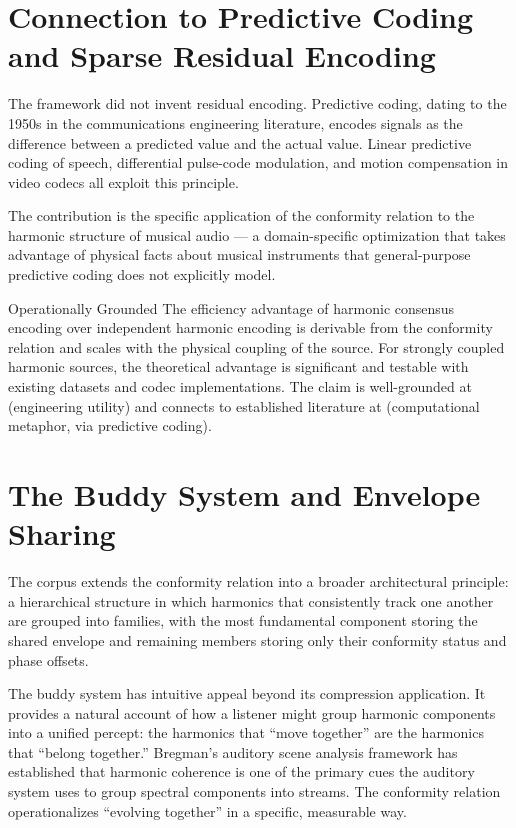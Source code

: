 \section{Connection to Predictive Coding and Sparse Residual Encoding}
\label{sec:predictive-coding}

The \HCFone{} framework did not invent residual encoding. Predictive
coding, dating to the 1950s in the communications engineering
literature, encodes signals as the difference between a predicted
value and the actual value. Linear predictive coding of speech,
differential pulse-code modulation, and motion compensation in
video codecs all exploit this principle.

The \HCFone{} contribution is the specific application of the
conformity relation to the harmonic structure of musical audio ---
a domain-specific optimization that takes advantage of physical
facts about musical instruments that general-purpose predictive
coding does not explicitly model.

\begin{epistemicstatus}{Operationally Grounded}
The efficiency advantage of harmonic consensus encoding over
independent harmonic encoding is derivable from the conformity
relation and scales with the physical coupling of the source.
For strongly coupled harmonic sources, the theoretical advantage
is significant and testable with existing datasets and codec
implementations. The claim is well-grounded at \LevelI{}
(engineering utility) and connects to established literature
at \LevelII{} (computational metaphor, via predictive coding).
\end{epistemicstatus}

\section{The Buddy System and Envelope Sharing}
\label{sec:buddy-system}

The corpus extends the conformity relation into a broader
architectural principle: a hierarchical structure in which
harmonics that consistently track one another are grouped into
families, with the most fundamental component storing the shared
envelope and remaining members storing only their conformity
status and phase offsets.

The buddy system has intuitive appeal beyond its compression
application. It provides a natural account of how a listener
might group harmonic components into a unified percept: the
harmonics that ``move together'' are the harmonics that ``belong
together.'' Bregman's auditory scene analysis framework has
established that harmonic coherence is one of the primary cues
the auditory system uses to group spectral components into streams.
The \HCFone{} conformity relation operationalizes ``evolving
together'' in a specific, measurable way.

